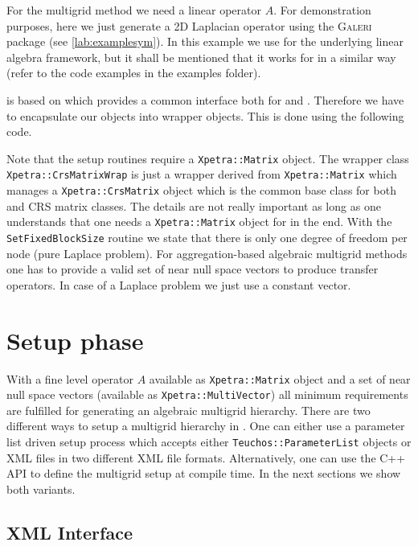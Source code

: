 \documentclass[10pt,fleqn]{book}
\providecommand\printCppListing[1]{

}
\begin{document}
For the multigrid method we need a linear operator $A$. For demonstration purposes, here we just generate a 2D Laplacian operator using the \textsc{Galeri} package (see \ref{lab:examplesym}). In this example we use \epetra for the underlying linear algebra framework, but it shall be mentioned that it works for \tpetra in a similar way (refer to the code examples in the \muelu examples folder).
\printCppListing{laplace2d.cpp_4.fragment}

\muelu is based on \xpetra which provides a common interface both for \epetra and \tpetra. Therefore we have to encapsulate our \epetra objects into \xpetra wrapper objects. This is done using the following code.
\printCppListing{laplace2d.cpp_6.fragment}
Note that the \muelu setup routines require a \texttt{Xpetra::Matrix} object. The wrapper class \texttt{Xpetra::CrsMatrixWrap} is just a wrapper derived from \texttt{Xpetra::Matrix} which manages a \texttt{Xpetra::CrsMatrix} object which is the common base class for both \epetra and \tpetra CRS matrix classes. The details are not really important as long as one understands that one needs a \texttt{Xpetra::Matrix} object for \muelu in the end.
With the \texttt{SetFixedBlockSize} routine we state that there is only one degree of freedom per node (pure Laplace problem).
For aggregation-based algebraic multigrid methods one has to provide a valid set of near null space vectors to produce transfer operators. In case of a Laplace problem we just use a constant vector.
\printCppListing{laplace2d.cpp_8.fragment}

\section{Setup phase}

With a fine level operator $A$ available as \texttt{Xpetra::Matrix} object and a set of near null space vectors (available as \texttt{Xpetra::MultiVector}) all minimum requirements are fulfilled for generating an algebraic multigrid hierarchy. There are two different ways to setup a multigrid hierarchy in \muelu. One can either use a parameter list driven setup process which accepts either \texttt{Teuchos::ParameterList} objects or XML files in two different XML file formats. Alternatively, one can use the \muelu C++ API to define the multigrid setup at compile time. In the next sections we show both variants.

\subsection{XML Interface}
\end{document}
